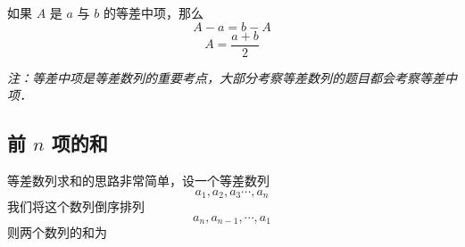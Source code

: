 如果 $A$ 是 $a$ 与 $b$ 的等差中项，那么
\begin{equation}
A - a = b - A
\end{equation}
\begin{equation}
A = \frac{a+b}{2}
\end{equation}

\textsl{注：等差中项是等差数列的重要考点，大部分考察等差数列的题目都会考察等差中项．}

\subsection{前 $n$ 项的和}
等差数列求和的思路非常简单，设一个等差数列
\begin{equation}
a_1,a_2,a_3\cdots,a_n
\end{equation}
我们将这个数列倒序排列
\begin{equation}
a_n,a_{n-1},\cdots,a_1
\end{equation}
则两个数列的和为
\begin{equation}

\end{equation}